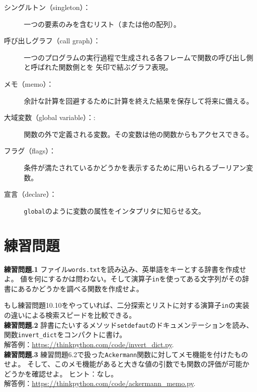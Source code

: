 \documentclass[a4j,12pt,makeidx]{jbook}
\newcommand{\tp}{\thechapter}
\begin{document}
\begin{description}
\item[シングルトン（singleton）：] 一つの要素のみを含むリスト（または他の配列）。

\item[呼び出しグラフ（call graph）：] 一つのプログラムの実行過程で生成される各フレームで関数の呼び出し側と呼ばれた関数側とを
矢印で結ぶグラフ表現。

\item[メモ（memo）：] 余計な計算を回避するために計算を終えた結果を保存して将来に備える。

\item[大域変数（global variable）：:] 関数の外で定義される変数。その変数は他の関数からもアクセスできる。

\item[フラグ（flags）：] 条件が満たされているかどうかを表示するために用いられるブーリアン変数。

\item[宣言（declare）：] {\tt global}のように変数の属性をインタプリタに知らせる文。

\end{description}
%
\section{練習問題}
\noindent
{\bf 練習問題\tp.1} ファイル{\tt words.txt}を読み込み、英単語をキーとする辞書を作成せよ。
値を何にするかは問わない。そして演算子{\tt in}を使ってある文字列がその辞書にあるかどうかを調べる関数を作成せよ。\par
もし練習問題10.10をやっていれば、二分探索とリストに対する演算子{\tt in}の実装の違いによる検索スピードを比較できる。\\

\noindent
{\bf 練習問題\tp.2} 辞書にたいするメソッド{\tt setdefaut}のドキュメンテーションを読み、関数{\tt invert\_dict}をコンパクトに書け。\\
解答例：\url{https://thinkpython.com/code/invert_dict.py}.\\

\noindent
{\bf 練習問題\tp.3} 練習問題6.2で扱った{\tt Ackermann}関数に対してメモ機能を付けたものせよ。
そして、このメモ機能があると大きな値の引数でも関数の評価が可能かどうかを確認せよ。
ヒント：なし。\\
解答例：\url{https://thinkpython.com/code/ackermann_memo.py}.\\
\end{document}
